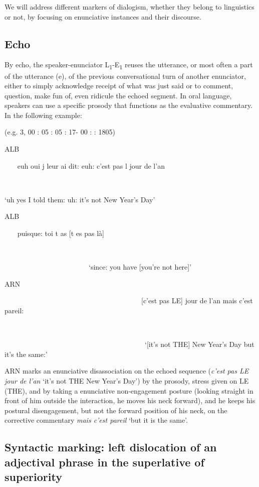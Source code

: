 \documentclass[output=paper]{langscibook}
\begin{document}
We will address different markers of dialogism, whether they belong to linguistics or not, by focusing on enunciative instances and their discourse. 

\subsection{Echo}

By echo, the speaker-enunciator L\textsubscript{1}{}-E\textsubscript{1} reuses the utterance, or most often a part of the utterance (e), of the previous conversational turn of another enunciator, either to simply acknowledge receipt of what was just said or to comment, question, make fun of, even ridicule the echoed segment. In oral language, speakers can use a specific prosody that functions as the evaluative commentary. In the following example:\largerpage[2]

\ea 
\label{ex:8:4}
{(e.g. 3, 00 : 05 : 05 : 17- 00 : : 1805)}

\upshape\ttfamily
\parbox{8mm}{ALB}{~~ ~euh oui j{\textasciigrave} leur ai dit: euh: c'est pas l{\textasciigrave} jour de l'an}\\
\parbox{8mm}{~}{‘uh yes I told them: uh: it's not New Year's Day’}\medskip

\parbox{8mm}{ALB}{~~ ~puisque: toi t{\textasciigrave} as [t{\textasciigrave} es pas là]}\\
\parbox{8mm}{~}{~~~~~~~~~~~~~~~~~~~~~~~~‘since: you have [you're not here]’}\medskip
	
\parbox{8mm}{ARN}{~~~~~~~~~~~~~~~~~~~~~~~~~~~~~~~~~~~~~~~[c'est pas LE] jour de l'an mais c'est pareil:}\\ 
\parbox{8mm}{~}{~~~~~~~~~~~~~~~~~~~~~~~~~~~~~~~~~~~~~~~~‘[it's not THE] New Year's Day but it's the same:’}\\

\z 

{ARN marks an enunciative disassociation on the echoed sequence (\textit{c’est pas LE jour de l’an} ‘it’s not THE New Year's Day’) by the prosody, stress given on LE (THE), and by taking a enunciative non-engagement posture (looking straight in front of him outside the interaction, he moves his neck forward), and he keeps his postural disengagement, but not the forward position of his neck, on the corrective commentary \textit{mais c’est pareil} ‘but it is the same’.}

\subsection{Syntactic marking: left dislocation of an adjectival phrase in the superlative of superiority}\largerpage
\end{document}

